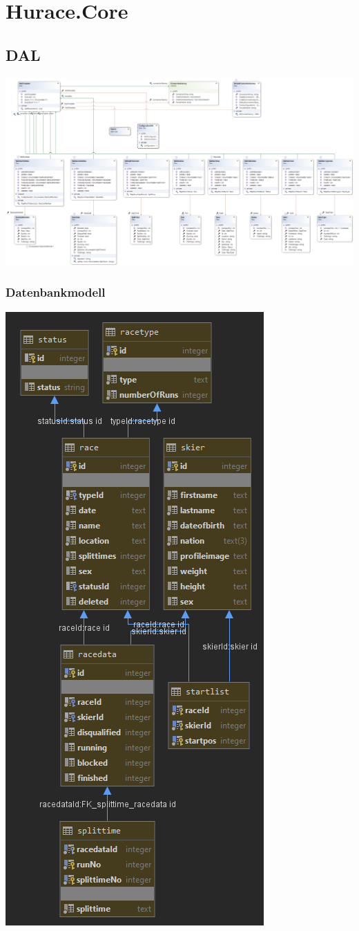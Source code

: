 \documentclass[a4paper, 12pt]{article}
\begin{document}
	\section{Hurace.Core}
	\subsection{DAL}
	\includegraphics[width=.9\textwidth]{img/DAL.png}
	\subsubsection{Datenbankmodell}
	\includegraphics[width=.5\textwidth]{img/huraceDB.png}
	\newpage
\end{document}
